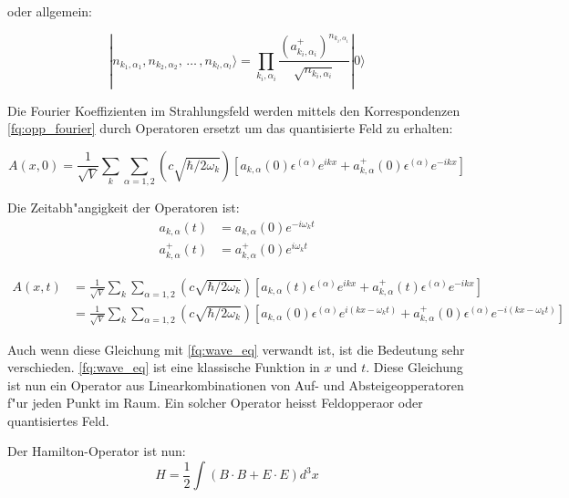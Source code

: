 oder allgemein:

\begin{equation}
|n_{k_1,\alpha_1}, n_{k_2,\alpha_2}, \, \hdots \, , n_{k_l,\alpha_l}\rangle =
 \prod_{k_i,\alpha_i}\frac{(a^+_{k_i,\alpha_i})^{n_{k_i,\alpha_i}}}{\sqrt{n_{k_i,\alpha_i}}} |0\rangle
\end{equation}

Die Fourier Koeffizienten im Strahlungsfeld werden mittels den Korrespondenzen \ref{fq:opp_fourier} durch Operatoren ersetzt um das quantisierte Feld zu erhalten:

\begin{equation}
A(x,0) = \frac{1}{\sqrt{V}} \sum_k \sum_{\alpha=1,2} \left(c \sqrt{\hbar/2 \omega_k}\right)\left[a_{k,\alpha}(0) \epsilon^{(\alpha)} e^{ikx} + a^+_{k,\alpha}(0) \epsilon^{(\alpha)} e^{-ikx}\right]
\end{equation}

Die Zeitabh"angigkeit der Operatoren ist:
\begin{equation}
\begin{split}
a_{k,\alpha}(t) &= a_{k,\alpha}(0) e^{-i \omega_k t} \\
a^+_{k,\alpha}(t) &= a^+_{k,\alpha}(0) e^{i \omega_k t}
\end{split}
\end{equation}

\begin{equation}
\begin{split}
A(x,t) &= \frac{1}{\sqrt{V}} \sum_k \sum_{\alpha=1,2} \left(c \sqrt{\hbar/2 \omega_k}\right)\left[a_{k,\alpha}(t) \epsilon^{(\alpha)} e^{ikx} + a^+_{k,\alpha}(t) \epsilon^{(\alpha)} e^{-ikx}\right]\\
	&= \frac{1}{\sqrt{V}} \sum_k \sum_{\alpha=1,2} \left(c \sqrt{\hbar/2 \omega_k}\right)\left[a_{k,\alpha}(0) \epsilon^{(\alpha)} e^{i(kx-\omega_k t)} + a^+_{k,\alpha}(0) \epsilon^{(\alpha)} e^{-i(kx-\omega_k t)}\right]
\end{split}
\end{equation}

Auch wenn diese Gleichung mit \ref{fq:wave_eq} verwandt ist, ist die Bedeutung sehr verschieden. \ref{fq:wave_eq} ist eine klassische Funktion in $x$ und $t$. Diese Gleichung ist nun ein Operator aus Linearkombinationen von Auf- und Absteigeopperatoren f"ur jeden Punkt im Raum. Ein solcher Operator heisst Feldopperaor oder quantisiertes Feld.

Der Hamilton-Operator ist nun:
\begin{equation}
H = \frac{1}{2} \int (B \cdot B + E \cdot E) d^3 x
\end{equation}

